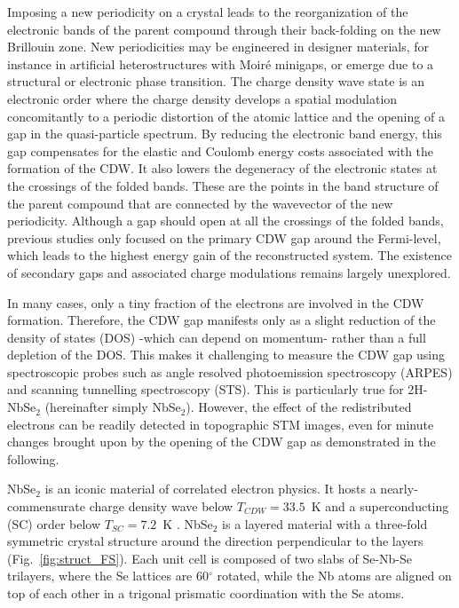 \documentclass[aps,prl,twocolumn,superscriptaddress]{revtex4-2}
\begin{document}
Imposing a new periodicity on a crystal leads to the reorganization of the electronic bands of the parent compound through their back-folding on the new Brillouin zone. New periodicities may be engineered in designer materials, for instance in artificial heterostructures with Moir\'{e} minigaps, or emerge due to a structural or electronic phase transition. The charge density wave state is an electronic order where the charge density develops a spatial modulation concomitantly to a periodic distortion of the atomic lattice and the opening of a gap in the quasi-particle spectrum. By reducing the electronic band energy, this gap compensates for the elastic and Coulomb energy costs associated with the formation of the CDW. It also lowers the degeneracy of the electronic states at the crossings of the folded bands. These are the points in the band structure of the parent compound that are connected by the wavevector of the new periodicity. Although a gap should open at all the crossings of the folded bands, previous studies only focused on the primary CDW gap around the Fermi-level, which leads to the highest energy gain of the reconstructed system. The existence of secondary gaps and associated charge modulations remains largely unexplored.

In many cases, only a tiny fraction of the electrons are involved in the CDW formation. Therefore, the CDW gap manifests only as a slight reduction of the density of states (DOS) -which can depend on momentum- rather than a  full depletion of the DOS. This makes it challenging to measure the CDW gap using spectroscopic probes such as angle resolved photoemission spectroscopy (ARPES) and scanning tunnelling spectroscopy (STS). This is particularly true for 2H-NbSe$_2$ \cite{Wang1990,Borisenko2009,Rahn2012,Soumyanarayanan2013,Arguello2014} (hereinafter simply NbSe$_2$). However, the effect of the redistributed electrons can be readily detected in topographic STM images, even for minute changes brought upon by the opening of the CDW gap as demonstrated in the following.

NbSe$_2$ is an iconic material of correlated electron physics. It hosts a nearly-commensurate charge density wave below $T_{CDW}=33.5$~K and a superconducting (SC) order below $T_{SC}=7.2$~K \cite{Revolinsky1965, Wilson1975, Harper1975, Long1977, Moncton1975}. NbSe$_2$ is a layered material with a three-fold symmetric crystal structure around the direction perpendicular to the layers (Fig.~\ref{fig:struct_FS}). Each unit cell is composed of two slabs of Se-Nb-Se trilayers, where the Se lattices are 60$^{\circ}$ rotated, while the Nb atoms are aligned on top of each other in a trigonal prismatic coordination with the Se atoms. 
\end{document}
